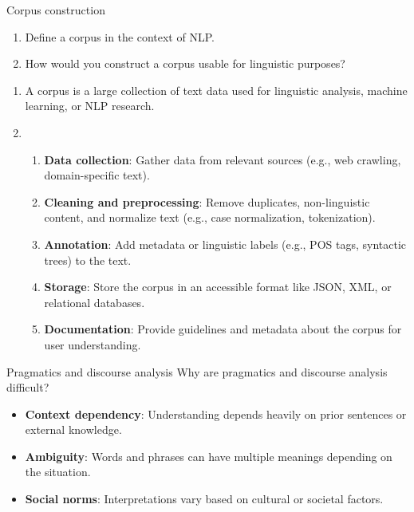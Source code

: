 \documentclass{article}
\begin{document}
\begin{exercise}{Corpus construction}\label{ex:corpus}
  \begin{enumerate}
    \item Define a corpus in the context of NLP.
    \item How would you construct a corpus usable for linguistic purposes?
  \end{enumerate}

  \begin{solution}
    \begin{enumerate}
      \item A corpus is a large collection of text data used for linguistic analysis, machine learning, or NLP research.
      \item \begin{enumerate}
          \item \textbf{Data collection}: Gather data from relevant sources (e.g., web crawling, domain-specific text).
          \item \textbf{Cleaning and preprocessing}: Remove duplicates, non-linguistic content, and normalize text (e.g., case normalization, tokenization).
          \item \textbf{Annotation}: Add metadata or linguistic labels (e.g., POS tags, syntactic trees) to the text.
          \item \textbf{Storage}: Store the corpus in an accessible format like JSON, XML, or relational databases.
          \item \textbf{Documentation}: Provide guidelines and metadata about the corpus for user understanding.
        \end{enumerate}
    \end{enumerate}
  \end{solution}
\end{exercise}

\begin{exercise}{Pragmatics and discourse analysis}\label{ex:pragmatics}
  Why are pragmatics and discourse analysis difficult?

  \begin{solution}
    \begin{itemize}
      \item \textbf{Context dependency}: Understanding depends heavily on prior sentences or external knowledge.
      \item \textbf{Ambiguity}: Words and phrases can have multiple meanings depending on the situation.
      \item \textbf{Social norms}: Interpretations vary based on cultural or societal factors.
    \end{itemize}
  \end{solution}
\end{exercise}
\end{document}
